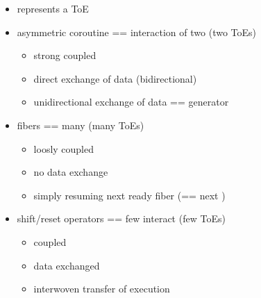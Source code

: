 \begin{itemize}
\item \ectx represents a ToE
\item asymmetric coroutine == interaction of two \ectx (two ToEs)
    \begin{itemize}
        \item strong coupled
        \item direct exchange of data (bidirectional)
        \item unidirectional exchange of data == generator
    \end{itemize}
\item fibers == many \ectx (many ToEs)
    \begin{itemize}
        \item loosly coupled
        \item no data exchange
        \item simply resuming next ready fiber (== next \ectx)
    \end{itemize}
\item shift/reset operators == few \ectx interact (few ToEs)
    \begin{itemize}
        \item coupled
        \item data exchanged
        \item interwoven transfer of execution
    \end{itemize}
\end{itemize}
